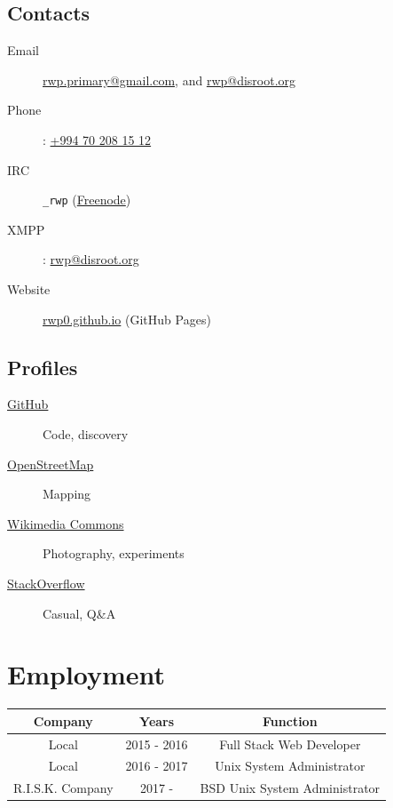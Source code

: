 \documentclass {article}
\begin{document}
     \subsection{Contacts}
       \begin{description}
         \item[Email] \href{mailto:rwp.primary@gmail.com}{rwp.primary@gmail.com}, and \href{mailto:rwp@disroot.org}{rwp@disroot.org}
         \item[Phone]: \href{tel:+994702081512}{+994 70 208 15 12}
         \item[IRC] \verb|_rwp| (\href{https://freenode.net/}{Freenode})
         \item[XMPP]: \url{rwp@disroot.org}
         \item[Website] \href{https://rwp0.github.io/}{rwp0.github.io} (GitHub Pages)
       \end{description}

     \subsection{Profiles}
       \begin{description}
         \item[\href{https://github.com/rwp0}{GitHub}] Code, discovery
         \item[\href{https://www.openstreetmap.org/user/rwp_}{OpenStreetMap}] Mapping
         \item[\href{https://commons.wikimedia.org/wiki/User:Rwp0}{Wikimedia Commons}] Photography, experiments
         \item[\href{https://stackoverflow.com/users/13762488/rwp}{StackOverflow}] Casual, Q\&A
       \end{description}

  \section{Employment}
    \begin {tabular} { c | c | c  }
      \hline			
      \textbf {Company} & \textbf {Years} & \textbf {Function} \\
      \hline  

      Local & 2015 - 2016 & Full Stack Web Developer \\
      Local & 2016 - 2017 & Unix System Administrator \\
      R.I.S.K. Company & 2017 - & BSD Unix System Administrator \\

      \hline  
    \end{tabular}
\end{document}
